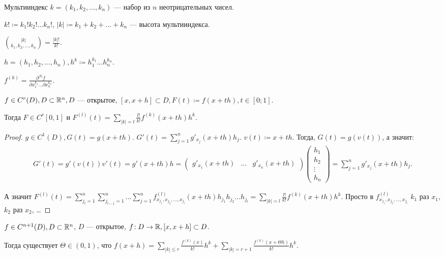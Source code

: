 \begin{definition}
    Мультииндекс $k = (k_1, k_2, \ldots, k_n)$ --- набор из $n$ неотрицательных чисел.

    $k! \coloneqq k_1!k_2!\ldots k_n!$, $|k| \coloneqq k_1 + k_2 + \ldots + k_n$ --- высота мультииндекса.

    $\binom{|k|}{k_1, k_2, \ldots, k_n} =  \frac{|k|!}{k!}$.

    $h=(h_1, h_2, \ldots, h_n), h^k \coloneqq h_1^{k_1}\ldots h_n^{k_n}$.

    $f^{(k)} = \frac{\partial^{|k|} f}{\partial x_1^{k_1} \ldots \partial x_n^{k_n}}$.
\end{definition}

\begin{lemma}
    $f \in C^r(D), D \subset \mathbb{R}^n, D$ --- открытое,  $[x, x + h] \subset D, F(t) \coloneqq f(x+th), t \in [0; 1]$.

    Тогда $F \in C^r[0, 1]$ и  $F^{(l)}(t) = \sum\limits_{|k| = l} \frac{l!}{k!}f^{(k)}(x + th)h^k$.
\end{lemma}
\begin{proof}
    $g \in C^1(D), G(t) = g(x+th)$.  $G'(t) = \sum\limits_{j=1}^n g'_{x_j}(x+th) h_j$.  $v(t) \coloneqq x+th$.
    Тогда, $G(t) = g(v(t))$, а значит: 
    \begin{align*}
        G'(t) = g'(v(t))v'(t) = g'(x+th)h= \begin{pmatrix} g'_{x_1}(x+th) & \ldots & g'_{x_n}(x+th) \end{pmatrix} \begin{pmatrix} h_1 \\ h_2 \\ \vdots \\ h_n \end{pmatrix} = \sum\limits_{j=1}^n g'_{x_j}(x+th)h_j.
    \end{align*}

    А значит $F^{(l)}(t) = \sum\limits_{j_l=1}^n \sum\limits_{j_{l-1}=1}^n \ldots \sum\limits_{j=1}^n f^{(l)}_{x_{j_1}, x_{j_2}, \ldots, x_{j_l}}(x+th)h_{j_1}h_{j_2}\ldots h_{j_l} = \sum\limits_{|k| = l} \frac{l!}{k!} f^{(k)}(x+th)h^k$. Просто в $f^{(l)}_{x_{j_1}, x_{j_2}, \ldots, x_{j_l}}$ $k_1$ раз $x_1$, $k_2$ раз $x_2$, \ldots
\end{proof}
\begin{theorem}
    $f \in C^{n+1}(D), D \subset \mathbb{R}^n$,  $D$ --- открытое,  $f\!: D \to \mathbb{R}, [x, x+h] \subset D$. 

    Тогда существует  $\Theta \in (0, 1)$, что  $f(x+h) = \sum\limits_{|k| \le r} \frac{f^{(k)}(x)}{k!}h^k + \sum\limits_{|k| = r+1} \frac{f^{(k)}(x + \Theta h)}{k!} h^k$.
\end{theorem}
